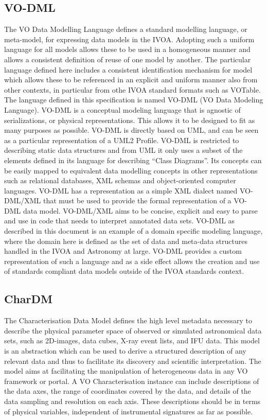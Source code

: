 \documentclass[11pt,a4paper]{ivoa}
\begin{document}
\subsection{VO-DML}

The VO Data Modelling Language defines a standard modelling language, or meta-model, for 
expressing data models in the IVOA. Adopting such a uniform language for all models allows 
these to be used in a homogeneous manner and allows a consistent definition of reuse of one 
model by another. The particular language defined here includes a consistent identification 
mechanism for model which allows these to be referenced in an explicit and uniform manner 
also from other contexts, in particular from othe IVOA standard formats such as VOTable. 
The language defined in this specification is named VO-DML (VO Data Modeling Language). 
VO-DML is a conceptual modeling language that is agnostic of serializations, or physical 
representations. This allows it to be designed to fit as many purposes as possible. VO-DML 
is directly based on UML, and can be seen as a particular representation of a UML2 Profile. 
VO-DML is restricted to describing static data structures and from UML it only uses a subset 
of the elements defined in its language for describing ``Class Diagrams''. Its concepts can 
be easily mapped to equivalent data modelling concepts in other representations such as 
relational databases, XML schemas and object-oriented computer languages. VO-DML has a 
representation as a simple XML dialect named VO-DML/XML that must be used to provide the 
formal representation of a VO-DML data model. VO-DML/XML aims to be concise, explicit and 
easy to parse and use in code that needs to interpret annotated data sets. VO-DML as 
described in this document is an example of a domain specific modeling language, where the 
domain here is defined as the set of data and meta-data structures handled in the IVOA and 
Astronomy at large. VO-DML provides a custom representation of such a language and as a 
side effect allows the creation and use of standards compliant data models outside of the 
IVOA standards context. 

\subsection{CharDM} 

The Characterisation Data Model defines the high level metadata necessary to describe the 
physical parameter space of observed or simulated astronomical data sets, such as 2D-images, 
data cubes, X-ray event lists, and IFU data. This model is an abstraction which can be used 
to derive a structured description of any relevant data and thus to facilitate its discovery 
and scientific interpretation. The model aims at facilitating the manipulation of heterogeneous 
data in any VO framework or portal. A VO Characterisation instance can include descriptions of 
the data axes, the range of coordinates covered by the data, and details of the data sampling 
and resolution on each axis. These descriptions should be in terms of physical variables, 
independent of instrumental signatures as far as possible.
\end{document}
